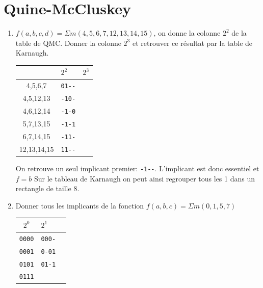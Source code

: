 \documentclass[a4paper,10pt]{exam}
\begin{document}
\section{Quine-McCluskey}
\begin{enumerate}
  \item $f(a,b,c,d) = \Sigma m(4,5,6,7,12,13,14,15)$, on donne la colonne $2^2$
    de la table de QMC. Donner la colonne $2^3$ et retrouver ce résultat par la
    table de Karnaugh.

    \begin{center}
    \begin{tabular}{cll}
              & $2^2$ & $2^3$ \\
      \hline
      4,5,6,7     & \verb!01--!  &\\
      4,5,12,13   & \verb!-10-!  &\\
      4,6,12,14   & \verb!-1-0!  &\\
      \hline
      5,7,13,15   & \verb!-1-1!  &\\
      6,7,14,15   & \verb!-11-!  &\\
      12,13,14,15 & \verb!11--!  &\\
      \hline
    \end{tabular}
    \end{center}

    \begin{solution}
      On retrouve un seul implicant premier: \verb!-1--!.
      L'implicant est donc essentiel et $f=b$
      Sur le tableau de Karnaugh on peut ainsi regrouper tous les 1
      dans un rectangle de taille 8.
    \end{solution}

    \item Donner tous les implicants de la fonction $f(a,b,c) = \Sigma
      m(0,1,5,7)$

      \begin{solution}
        \begin{center}
          \begin{tabular}{cll}
            $2^0$& $2^1$& \\
            \hline
            \verb!0000!& \verb!000-!  &\\
            \hline
            \verb!0001!& \verb!0-01!  &\\
            \hline
            \verb!0101!& \verb!01-1!  &\\
            \hline
            \verb!0111!&  &\\
            \hline
          \end{tabular}
        \end{center}


\end{solution}
\end{enumerate}
\end{document}
